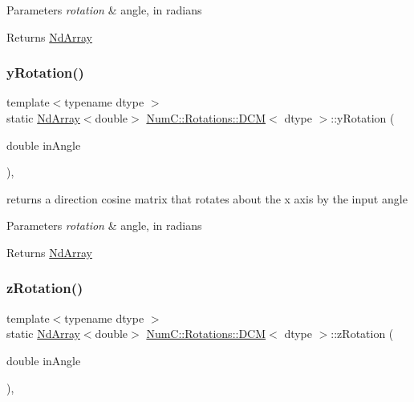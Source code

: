 \begin{DoxyParams}{Parameters}
{\em rotation} & angle, in radians \\
\hline
\end{DoxyParams}
\begin{DoxyReturn}{Returns}
\mbox{\hyperlink{class_num_c_1_1_nd_array}{Nd\+Array}} 
\end{DoxyReturn}
\mbox{\label{class_num_c_1_1_rotations_1_1_d_c_m_a203f020afda83b949ed4245219e17c0c}} 
\subsubsection{\texorpdfstring{y\+Rotation()}{yRotation()}}
{\footnotesize\ttfamily template$<$typename dtype $>$ \\
static \mbox{\hyperlink{class_num_c_1_1_nd_array}{Nd\+Array}}$<$double$>$ \mbox{\hyperlink{class_num_c_1_1_rotations_1_1_d_c_m}{Num\+C\+::\+Rotations\+::\+D\+CM}}$<$ dtype $>$\+::y\+Rotation (\begin{DoxyParamCaption}\item[{double}]{in\+Angle }\end{DoxyParamCaption})\hspace{0.3cm}{\ttfamily [inline]}, {\ttfamily [static]}}

returns a direction cosine matrix that rotates about the x axis by the input angle


\begin{DoxyParams}{Parameters}
{\em rotation} & angle, in radians \\
\hline
\end{DoxyParams}
\begin{DoxyReturn}{Returns}
\mbox{\hyperlink{class_num_c_1_1_nd_array}{Nd\+Array}} 
\end{DoxyReturn}
\mbox{\label{class_num_c_1_1_rotations_1_1_d_c_m_a7ea7bf90a5322aa29246431b15e4b1ad}} 
\subsubsection{\texorpdfstring{z\+Rotation()}{zRotation()}}
{\footnotesize\ttfamily template$<$typename dtype $>$ \\
static \mbox{\hyperlink{class_num_c_1_1_nd_array}{Nd\+Array}}$<$double$>$ \mbox{\hyperlink{class_num_c_1_1_rotations_1_1_d_c_m}{Num\+C\+::\+Rotations\+::\+D\+CM}}$<$ dtype $>$\+::z\+Rotation (\begin{DoxyParamCaption}\item[{double}]{in\+Angle }\end{DoxyParamCaption})\hspace{0.3cm}{\ttfamily [inline]}, {\ttfamily [static]}}

